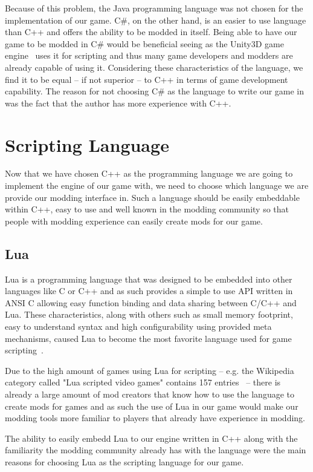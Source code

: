 Because of this problem, the Java programming language was not chosen for the implementation of our game. C\#, on the other hand,
is an easier to use language than C++ and offers the ability to be modded in itself. Being able to have our game to be modded
in C\# would be beneficial seeing as the Unity3D game engine~\cite{Unity} uses it for scripting and thus many game developers
and modders are already capable of using it. Considering these characteristics of the language, we find it to be equal -- if not
superior -- to C++ in terms of game development capability. The reason for not choosing C\# as the language to write our game in
was the fact that the author has more experience with C++.

\section{Scripting Language}

Now that we have chosen C++ as the programming language we are going to implement the engine of our game with, we need
to choose which language we are provide our modding interface in. Such a language should be easily embeddable within C++,
easy to use and well known in the modding community so that people with modding experience can easily create mods for our game.

\subsection{Lua}

Lua is a programming language that was designed to be embedded into other languages like C or C++ and as such
provides a simple to use API written in ANSI C allowing easy function
binding and data sharing between C/C++ and Lua. These characteristics, along with others such as small memory
footprint, easy to understand syntax and
high configurability using provided meta mechanisms, caused Lua to become the most favorite language used for game 
scripting~\cite{EngineSurvey}.

Due to the high amount of games using Lua for scripting -- e.g. the Wikipedia category called "Lua scripted video games" contains
157 entries~\cite{LuaScriptedVGs} -- there is already a large amount of mod creators that know how to use the language to
create mods for games and as such the use of Lua in our game would make our modding tools more familiar to players that already have
experience in modding.

The ability to easily embedd Lua to our engine written in C++ along with the familiarity the modding community already has with the
language were the main reasons for choosing Lua as the scripting language for our game.

